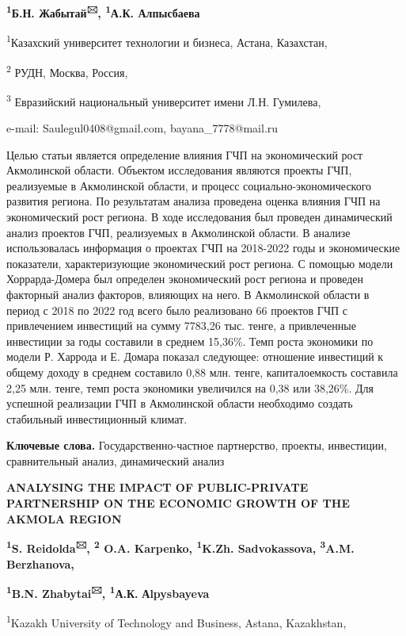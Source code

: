 {\bfseries \textsuperscript{1}Б.Н. Жабытай\textsuperscript{🖂},
\textsuperscript{1}А.К. Алпысбаева}

\textsuperscript{1}Казахский университет технологии и бизнеса, Астана,
Казахстан,

\textsuperscript{2} РУДН, Москва, Россия,

\textsuperscript{3} Евразийский национальный университет имени Л.Н.
Гумилева,

e-mail: Saulegul0408@gmail.com, bayana\_7778@mail.ru

Целью статьи является определение влияния ГЧП на экономический рост
Акмолинской области. Объектом исследования являются проекты ГЧП,
реализуемые в Акмолинской области, и процесс социально-экономического
развития региона. По результатам анализа проведена оценка влияния ГЧП на
экономический рост региона. В ходе исследования был проведен
динамический анализ проектов ГЧП, реализуемых в Акмолинской области. В
анализе использовалась информация о проектах ГЧП на 2018-2022 годы и
экономические показатели, характеризующие экономический рост региона. С
помощью модели Хоррарда-Домера был определен экономический рост региона
и проведен факторный анализ факторов, влияющих на него. В Акмолинской
области в период с 2018 по 2022 год всего было реализовано 66 проектов
ГЧП с привлечением инвестиций на сумму 7783,26 тыс. тенге, а
привлеченные инвестиции за годы составили в среднем 15,36\%. Темп роста
экономики по модели Р. Харрода и Е. Домара показал следующее: отношение
инвестиций к общему доходу в среднем составило 0,88 млн. тенге,
капиталоемкость составила 2,25 млн. тенге, темп роста экономики
увеличился на 0,38 или 38,26\%. Для успешной реализации ГЧП в
Акмолинской области необходимо создать стабильный инвестиционный климат.

{\bfseries Ключевые слова.} Государственно-частное партнерство, проекты,
инвестиции, сравнительный анализ, динамический анализ

{\bfseries ANALYSING THE IMPACT OF PUBLIC-PRIVATE PARTNERSHIP ON THE
ECONOMIC GROWTH OF THE AKMOLA REGION}

{\bfseries \textsuperscript{1}S. Reidolda\textsuperscript{🖂},
\textsuperscript{2} O.A. Karpenko, \textsuperscript{1}K.Zh.
Sadvokassova, \textsuperscript{3}A.M. Berzhanova,}

{\bfseries \textsuperscript{1}B.N. Zhabytai\textsuperscript{🖂},
\textsuperscript{1}А.К.} {\bfseries Аlpysbayeva}

\textsuperscript{1}Kazakh University of Technology and Business, Astana,
Kazakhstan,

